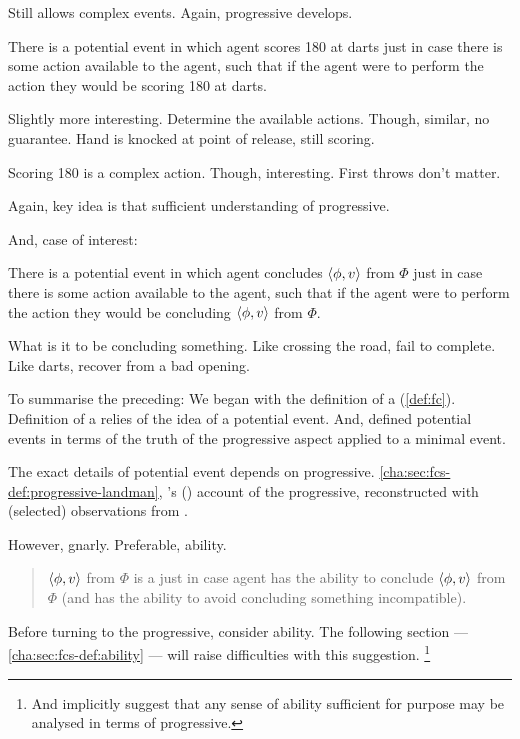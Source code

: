 \begin{note}
  Still allows complex events.
  Again, progressive develops.

  \begin{illustration}[Darts]
    There is a potential event in which agent scores 180 at darts just in case there is some action available to the agent, such that if the agent were to perform the action they would be scoring 180 at darts.
  \end{illustration}

  Slightly more interesting.
  Determine the available actions.
  Though, similar, no guarantee.
  Hand is knocked at point of release, still scoring.

  Scoring 180 is a complex action.
  Though, interesting.
  First throws don't matter.

  Again, key idea is that sufficient understanding of progressive.

  And, case of interest:

  \begin{illustration}[Concluding]
    There is a potential event in which agent concludes \(\langle \phi, v \rangle\) from \(\Phi\) just in case there is some action available to the agent, such that if the agent were to perform the action they would be concluding \(\langle \phi, v \rangle\) from \(\Phi\).
  \end{illustration}

  What is it to be concluding something.
  Like crossing the road, fail to complete.
  Like darts, recover from a bad opening.
\end{note}

\begin{note}[Summarising]
  To summarise the preceding:
  We began with the definition of a \fc{} (\autoref{def:fc}).
  Definition of a \fc{} relies of the idea of a potential event.
  And, defined potential events in terms of the truth of the progressive aspect applied to a minimal event.

  The exact details of potential event depends on progressive.
  \autoref{cha:sec:fcs-def:progressive-landman}, \citeauthor{Landman:1992wh}'s (\citeyear{Landman:1992wh}) account of the progressive, reconstructed with (selected) observations from \textcite{Szabo:2004ul}.

  However, gnarly.
  Preferable, ability.
  \begin{quote}
    \(\langle \phi, v \rangle\) from \(\Phi\) is a \fc{} just in case agent has the ability to conclude \(\langle \phi, v \rangle\) from \(\Phi\) (and has the ability to avoid concluding something incompatible).
  \end{quote}
  Before turning to the progressive, consider ability.
  The following section --- \autoref{cha:sec:fcs-def:ability} --- will raise difficulties with this suggestion.%
  \footnote{
    And implicitly suggest that any sense of ability sufficient for purpose may be analysed in terms of progressive.
  }
\end{note}

